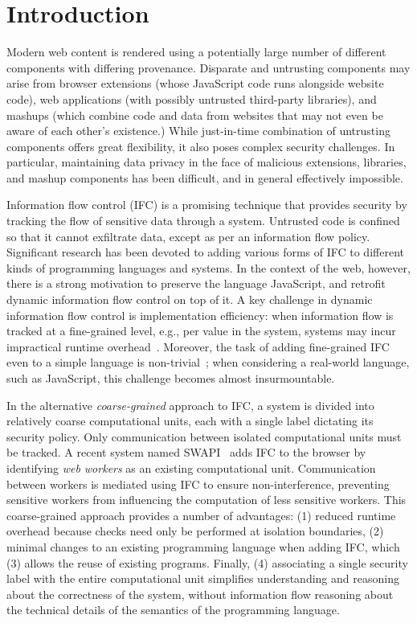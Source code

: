 \section{Introduction}
\label{sec:intro}

Modern web content is rendered using a potentially large number of
different components with differing provenance.
Disparate and untrusting components may arise from browser
extensions (whose JavaScript code runs alongside website
code), web applications (with possibly untrusted third-party
libraries), and mashups (which combine code and data from
websites that may not even be aware of each other's existence.)
While just-in-time combination of untrusting components
offers great flexibility, it also poses complex security challenges.
In particular, maintaining data privacy in the face of malicious
extensions, libraries, and mashup components has been difficult,
and in general effectively impossible.

Information flow control (IFC) is a promising technique
that provides security
by tracking the flow of sensitive data through a system.
Untrusted code is confined so that it cannot exfiltrate data, except as
per an information flow policy.  Significant research has been devoted to
adding various forms of IFC to different kinds of programming languages
and systems.  In the context of the web, however, there is a strong
motivation to preserve the language JavaScript, and retrofit dynamic information
flow control on top of it.  A key challenge in dynamic information
flow control is implementation efficiency: when
information flow is tracked at a fine-grained level,
e.g., per value in the system, systems may incur
impractical runtime overhead~\cite{JSFlow}.
%
Moreover, the task of adding fine-grained IFC even to a simple language is
non-trivial~\cite{hritcu2013testing}; when considering a real-world language,
such as JavaScript, this challenge becomes almost insurmountable.


In the alternative \textit{coarse-grained} approach to IFC,
a system is divided into relatively coarse computational units,
each with a single label dictating its security policy.
Only
communication between isolated computational units must be tracked.
A recent system named SWAPI~\cite{swapi} adds IFC to the
browser by identifying \emph{web workers} as an existing computational
unit.  Communication between workers is mediated using
IFC to ensure non-interference, preventing sensitive workers from
influencing the computation of less sensitive workers.
This coarse-grained approach provides a number of advantages:
(1) reduced runtime overhead because checks need only
be performed at isolation boundaries, (2) minimal changes to an
existing programming language when adding IFC, which (3) allows
the reuse of existing programs.  Finally, (4) associating
a single security label with the entire computational unit simplifies
understanding and reasoning about the correctness of the
system, without information flow reasoning about the
technical details of the semantics of the programming language.

